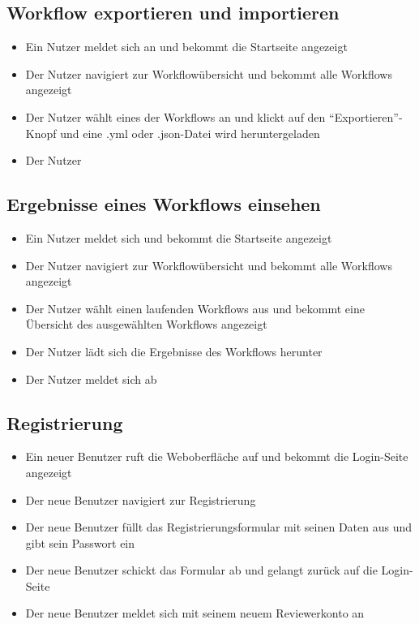 \subsection*{Workflow exportieren und importieren}
\begin{itemize}
    \item Ein \gls{Nutzer} meldet sich an und bekommt die Startseite angezeigt
    \item Der \gls{Nutzer} navigiert zur Workflowübersicht und bekommt alle Workflows angezeigt
    \item Der \gls{Nutzer} wählt eines der Workflows an und klickt auf den \enquote{Exportieren}-Knopf und eine .yml oder .json-Datei wird heruntergeladen
    \item Der \gls{Nutzer} 
\end{itemize}


\subsection*{Ergebnisse eines Workflows einsehen}
\begin{itemize}
    \item Ein \gls{Nutzer} meldet sich und bekommt die Startseite angezeigt
    \item Der \gls{Nutzer} navigiert zur Workflowübersicht und bekommt alle Workflows angezeigt
    \item Der \gls{Nutzer} wählt einen laufenden Workflows aus und bekommt eine Übersicht des ausgewählten Workflows angezeigt
    \item Der \gls{Nutzer} lädt sich die Ergebnisse des Workflows herunter
    \item Der \gls{Nutzer} meldet sich ab
\end{itemize}



\subsection*{Registrierung}
\begin{itemize}
    \item Ein neuer Benutzer ruft die Weboberfläche auf und bekommt die Login-Seite angezeigt
    \item Der neue Benutzer navigiert zur Registrierung
    \item Der neue Benutzer füllt das Registrierungsformular mit seinen Daten aus und gibt sein Passwort ein
    \item Der neue Benutzer schickt das Formular ab und gelangt zurück auf die Login-Seite
    \item Der neue Benutzer meldet sich mit seinem neuem \Gls{Reviewer}konto an
\end{itemize}

